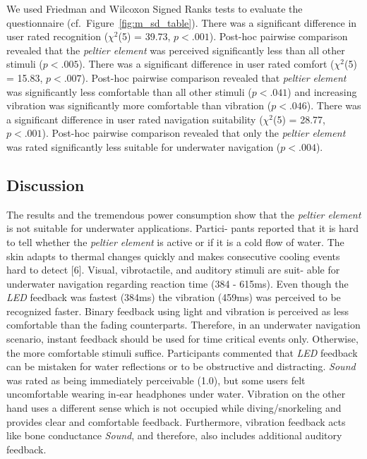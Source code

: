 We used Friedman and Wilcoxon Signed Ranks tests to evaluate the questionnaire (cf.\ Figure~\ref{fig:m_sd_table}).
There was a significant difference in user rated recognition ($\chi^2$(5) = 39.73, $p<.001$).
Post-hoc pairwise comparison revealed that the \emph{peltier element} was perceived significantly less than all other stimuli ($p<.005$). \newline
There was a significant difference in user rated comfort ($\chi^2$(5) = 15.83, $p<.007$).
Post-hoc pairwise comparison revealed that \emph{peltier element} was significantly less comfortable than all other stimuli ($p<.041$) and increasing vibration was significantly more comfortable than vibration ($p<.046$). \newline
There was a significant difference in user rated navigation suitability ($\chi^2$(5) = 28.77, $p<.001$). 
Post-hoc pairwise comparison revealed that only the \emph{peltier element} was rated significantly less suitable for underwater navigation ($p<.004$).

\subsection{Discussion}
The results and the tremendous power consumption show that the \emph{peltier element} is not suitable for underwater applications. 
Partici- pants reported that it is hard to tell whether the \emph{peltier element} is active or if it is a cold flow of water. 
The skin adapts to thermal changes quickly and makes consecutive cooling events hard to detect [6]. 
Visual, vibrotactile, and auditory stimuli are suit- able for underwater navigation regarding reaction time (384 - 615ms). 
Even though the \emph{LED} feedback was fastest (384ms) the vibration (459ms) was perceived to be recognized faster. 
Binary feedback using light and vibration is perceived as less comfortable than the fading counterparts. 
Therefore, in an underwater navigation scenario, instant feedback should be used for time critical events only. 
Otherwise, the more comfortable stimuli suffice. 
Participants commented that \emph{LED} feedback can be mistaken for water reflections or to be obstructive and distracting. 
\emph{Sound} was rated as being immediately perceivable (1.0), but some users felt uncomfortable wearing in-ear headphones under water. 
Vibration on the other hand uses a different sense which is not occupied while diving/snorkeling and provides clear and comfortable feedback. 
Furthermore, vibration feedback acts like bone conductance \emph{Sound}, and therefore, also includes additional auditory feedback.


